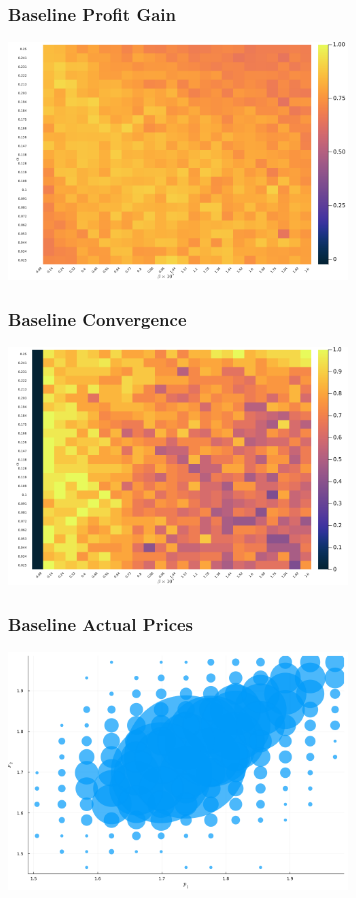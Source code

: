 \documentclass{beamer}
\begin{document}
\begin{frame}\frametitle{Baseline Profit Gain}
\begin{center}
	\includegraphics[width=9cm]{heatmap_profit_gain_small_main_delta_0.95.png}
\end{center}
\end{frame}
\begin{frame}\frametitle{Baseline Convergence}
\begin{center}
	\includegraphics[width=9cm]{heatmap_convergence_counts_small_main_delta_0.95.png}
\end{center}
\end{frame}
\begin{frame}\frametitle{Baseline Actual Prices}
\begin{center}
	\includegraphics[width=9cm]{scatter_plot_prices_small_main_delta_0.95.png}
\end{center}
\end{frame}
	
\end{document}
